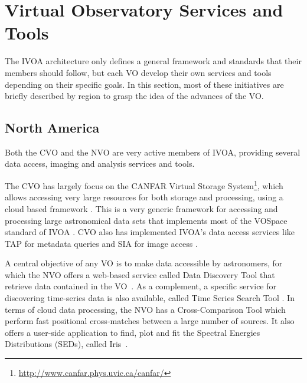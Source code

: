 \section{Virtual Observatory Services and Tools}

The IVOA architecture only defines a general framework and
standards that their members should follow, but each VO develop
their own services and tools depending on their specific goals.
In this section, most of these initiatives are briefly
described by region to grasp the idea of the advances of
the VO.

\subsection{North America}

Both the CVO and the NVO are very active members of IVOA,
providing several data access, imaging and analysis services 
and tools. 

The CVO has largely focus on the CANFAR Virtual Storage
System\footnote{\url{http://www.canfar.phys.uvic.ca/canfar/}}, which
allows accessing very large resources for both storage and processing, 
using a cloud based framework \cite{}. 
This is a very generic framework for accessing and processing 
large astronomical data sets that implements most of the
VOSpace standard of IVOA \cite{VOSPace}. CVO also has implemented
IVOA's data access services like TAP for metadata queries 
\cite{} and SIA for
image access \cite{}.

A central objective of any VO is to make data accessible by astronomers,
for which the NVO offers a web-based service called Data Discovery Tool 
that retrieve data contained in the VO~\cite{}. 
As a complement, a specific service for discovering time-series data
is also available, called Time Series Search Tool \cite{}.
In terms of cloud data processing, the NVO has a Cross-Comparison Tool 
which perform fast positional cross-matches between a large number of 
sources.
It also offers a user-side application to find, plot and fit the
Spectral Energies Distributions (SEDs), called Iris~\cite{}.

